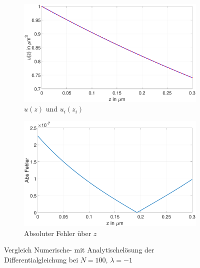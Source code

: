  \begin{figure}[h]
 	\begin{subfigure}[b]{0.5\textwidth}
 		\includegraphics[width=\textwidth]{figures/station_gl_2_1/test_n100}
		\caption{$u(z)$ und $u_{i}(z_i)$}
 	  \end{subfigure}
 	\hfill
 \begin{subfigure}[b]{0.5\textwidth}
 	\includegraphics[width=1\linewidth]{figures/station_gl_2_1/test_n100_fehler}
 	\caption{Absoluter Fehler über $z$}
  \end{subfigure}
\caption{Vergleich Numerische- mit Analytischelösung der Differentialgleichung bei $N=100,\,\lambda=-1$}
 	\label{fig:testn10}
 \end{figure}

